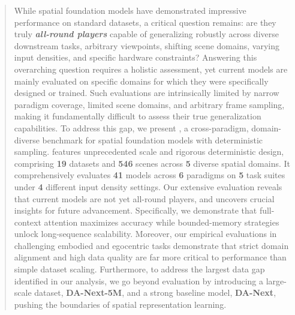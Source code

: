 \documentclass[11pt]{article}
\begin{document}
\vspace{8pt}
\begin{abstract}
While spatial foundation models have demonstrated impressive performance on standard datasets, a critical question remains: are they truly \textbf{\textit{all-round players}} capable of generalizing robustly across diverse downstream tasks, arbitrary viewpoints, shifting scene domains, varying input densities, and specific hardware constraints?
%
Answering this overarching question requires a holistic assessment, yet current models are mainly evaluated on specific domains for which they were specifically designed or trained.
%
Such evaluations are intrinsically limited by narrow paradigm coverage, limited scene domains, and arbitrary frame sampling, making it fundamentally difficult to assess their true generalization capabilities.
%
To address this gap, we present \textbf{\benchmark}, a cross-paradigm, domain-diverse benchmark for spatial foundation models with deterministic sampling.
%
\benchmark features unprecedented scale and rigorous deterministic design, comprising \textbf{19} datasets and \textbf{546} scenes across \textbf{5} diverse spatial domains. It comprehensively evaluates \textbf{41} models across \textbf{6} paradigms on \textbf{5} task suites under \textbf{4} different input density settings.
%
Our extensive evaluation reveals that current models are not yet all-round players, and uncovers crucial insights for future advancement. Specifically, we demonstrate that full-context attention maximizes accuracy while bounded-memory strategies unlock long-sequence scalability.
%
Moreover, our empirical evaluations in challenging embodied and egocentric tasks demonstrate that strict domain alignment and high data quality are far more critical to performance than simple dataset scaling.
%
Furthermore, to address the largest data gap identified in our analysis, we go beyond evaluation by introducing a large-scale dataset, \textbf{DA-Next-5M}, and a strong baseline model, \textbf{DA-Next}, pushing the boundaries of spatial representation learning.
\end{abstract}


\end{document}
